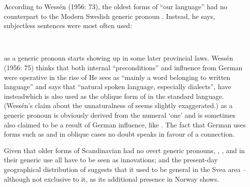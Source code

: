 According to Wessén (1956: 73), the oldest forms of “our language” had no counterpart to the Modern Swedish generic pronoun . Instead, he says, subjectless sentences were most often used: 



\ea\label{}
\\

\z 
\z

 as a generic pronoun starts showing up in some later provincial laws. Wessén (1956: 75) thinks that both internal “preconditions” and influence from German were operative in the rise of He sees  as “mainly a word belonging to written language” and says that “natural spoken language, especially dialects”, have instead\textstyleLinguisticExample{, }which is also used as the oblique form of  in the standard language. (Wessén’s claim about the unnaturalness of  seems slightly exaggerated.) as a generic pronoun is obviously derived from the numeral ‘one’ and is sometimes also claimed to be a result of German influence, like . The fact that German uses forms such as  and  in oblique cases no doubt speaks in favour of a connection.



Given that older forms of Scandinavian had no overt generic pronouns, , , and  in their generic use all have to be seen as innovations; and the present-day geographical distribution of  suggests that it used to be general in the Svea area – although not exclusive to it, as its additional presence in Norway shows. 




